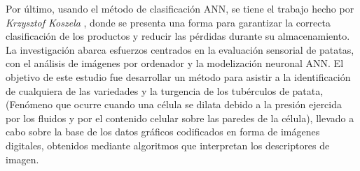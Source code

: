 Por último, usando el método de clasificación ANN, se tiene el trabajo hecho por \textit{Krzysztof Koszela} \cite{Przybyl2019}, donde se presenta una forma para garantizar la correcta clasificación de los productos y reducir las pérdidas durante su almacenamiento. La investigación abarca esfuerzos centrados en la evaluación sensorial de patatas, con el análisis de imágenes por ordenador y la modelización neuronal ANN. El objetivo de este estudio fue desarrollar un método para asistir a la identificación de cualquiera de las variedades y la turgencia de los tubérculos de patata, (Fenómeno que ocurre cuando una célula se dilata debido a la presión ejercida por los fluidos y por el contenido celular sobre las paredes de la célula), llevado a cabo sobre la base de los datos gráficos codificados en forma de imágenes digitales, obtenidos mediante algoritmos que interpretan los descriptores de imagen.\\

